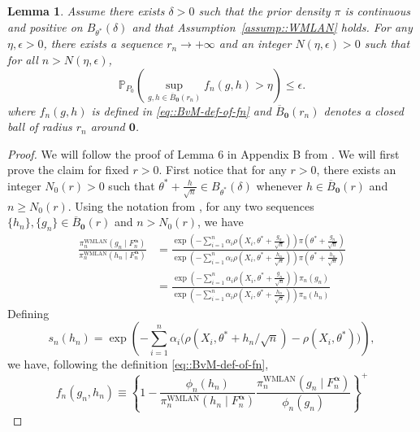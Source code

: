 \documentclass[11pt, oneside]{amsart}
\newtheorem{lemma}{Lemma}
\theoremstyle{definition}   %
\newcommand{\loss}{\rho}
\newcommand{\wempirical}{F_n^{\boldsymbol{\alpha}}}
\begin{document}
%
%
\begin{lemma}  
    \label{lemma:ballconvergence}
    Assume there exists $\delta > 0$ such that the prior density $\pi$ is continuous and positive on $B_{\theta^*}(\delta)$ and that Assumption~\ref{assump::WMLAN} holds.
    For any $\eta, \epsilon > 0$, there exists a sequence $r_n \rightarrow + \infty$ and an integer $N(\eta, \epsilon) > 0$ such that for all $n > N(\eta, \epsilon)$, 
    \[
        \mathbb{P}_{P_0} \left ( \underset{g,h \in \overline{B}_{\textbf{0}}(r_n) }{\sup} f_n(g, h) > \eta \right) \leq \epsilon.
    \]
    where $f_n(g,h)$ is defined in \eqref{eq::BvM-def-of-fn} and $\overline{B}_{\textbf{0}}(r_n)$ denotes a closed ball of radius $r_n$ around $\mathbf{0}$.
\end{lemma}

\begin{proof}
%
We will follow the proof of Lemma 6 in Appendix B from \cite{avellamedinaetal2021}. 
%
We will first prove the claim for fixed $r > 0$.
%
First notice that for any $r > 0$, there exists an integer $N_0(r) > 0$ such that $\theta ^ * + \frac{h}{\sqrt{n}} \in B_{\theta ^ *} (\delta)$ whenever $h \in \overline{B}_{\textbf{0}}(r)$ and $n \geq N_0(r)$. 
%
Using the notation from , for any two sequences $\{ h_n \}, \{ g_n \} \in \overline{B}_{\textbf{0}}(r)$ and $n > N_0(r)$, we have
%
\begin{equation*}
\begin{split}
    \frac{\pi^{\mathrm{WMLAN}}_{n}(g_n \mid \wempirical)} {\pi^{\mathrm{WMLAN}}_{n}(h_n \mid \wempirical)} 
    &=
    \frac{\exp\left ( - \sum_{i = 1}^n \alpha_i \loss(X_i,  \theta ^ * + \frac{g_n}{\sqrt{n}}) \right ) \pi(\theta ^ * + \frac{g_n}{\sqrt{n}})}{\exp\left ( - \sum_{i = 1}^n \alpha_i \loss(X_i,  \theta ^ * + \frac{h_n}{\sqrt{n}}) \right ) \pi(\theta ^ * + \frac{h_n}{\sqrt{n}})} \\
    &=
    \frac{\exp\left ( - \sum_{i = 1}^n \alpha_i \loss(X_i,  \theta ^ * + \frac{g_n}{\sqrt{n}}) \right ) \pi_n(g_n)}{\exp\left ( - \sum_{i = 1}^n \alpha_i \loss(X_i,  \theta ^ * + \frac{h_n}{\sqrt{n}}) \right ) \pi_n(h_n)}
\end{split}
\end{equation*}
%
Defining
%
\[
    s_n(h_n) = \exp \left ( -\sum_{i=1}^n \alpha_i \bigl ( \loss (X_i, \theta^* + h_n/\sqrt{n}) - \loss (X_i, \theta^*) \bigr ) \right ),
\]
%
we have, following the definition \eqref{eq::BvM-def-of-fn}, 
%
\[
    f_n(g_n, h_n) \equiv \left \{ 1 - \frac{\phi_n(h_n)}{\pi^{\mathrm{WMLAN}}_{n}(h_n \mid \wempirical)} \frac{\pi^{\mathrm{WMLAN}}_{n}(g_n \mid \wempirical)}{\phi_n(g_n)}\right \} ^ +
\]
\end{proof}
\end{document}
